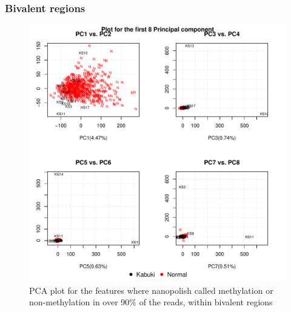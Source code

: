 \subsubsection{Bivalent regions}
\begin{figure}[!h]
    \centering
    \includegraphics[width=\textwidth]{figures/PCA/bivalent/pca_plot_label.pdf}
    \caption{PCA plot for the features where nanopolish called methylation or non-methylation in over 90\% of the reads, within bivalent regions}
    \label{fig:bivalent-PCA}
\end{figure}

